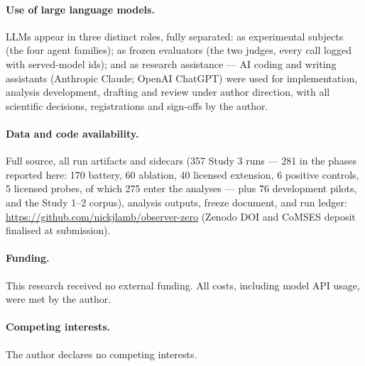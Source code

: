 \documentclass[11pt]{article}
\begin{document}
\paragraph{Use of large language models.} LLMs appear in three distinct roles, fully separated: as experimental subjects (the four agent families); as frozen evaluators (the two judges, every call logged with served-model ids); and as research assistance --- AI coding and writing assistants (Anthropic Claude; OpenAI ChatGPT) were used for implementation, analysis development, drafting and review under author direction, with all scientific decisions, registrations and sign-offs by the author.

\paragraph{Data and code availability.} Full source, all run artifacts and sidecars (357 Study 3 runs --- 281 in the phases reported here: 170 battery, 60 ablation, 40 licensed extension, 6 positive controls, 5 licensed probes, of which 275 enter the analyses --- plus 76 development pilots, and the Study 1--2 corpus), analysis outputs, freeze document, and run ledger: \url{https://github.com/nickjlamb/observer-zero} (Zenodo DOI and CoMSES deposit finalised at submission).

\paragraph{Funding.} This research received no external funding. All costs, including model API usage, were met by the author.

\paragraph{Competing interests.} The author declares no competing interests.
\end{document}
